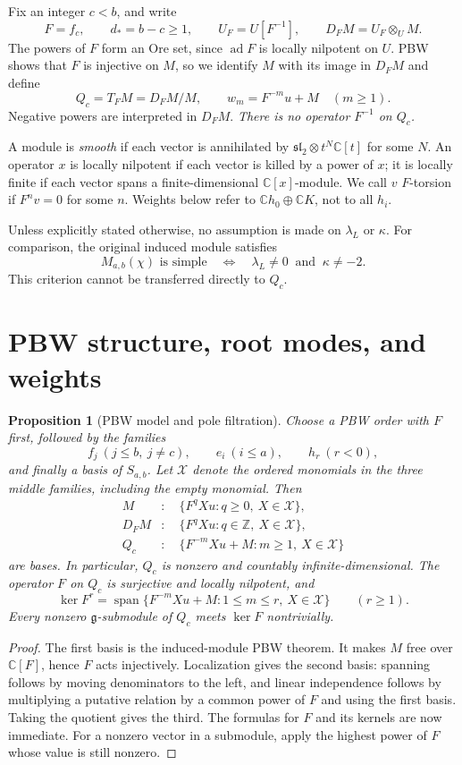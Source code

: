 \documentclass[11pt,a4paper]{article}
\newcommand{\C}{\mathbb C}
\newcommand{\Z}{\mathbb Z}
\newcommand{\g}{\mathfrak g}
\newcommand{\slc}{\mathfrak{sl}_2}
\newcommand{\ad}{\operatorname{ad}}
\newcommand{\Span}{\operatorname{span}}
\newcommand{\X}{\mathcal X}
\theoremstyle{plainupright}
\newtheorem{proposition}{Proposition}[section]
\begin{document}
Fix an integer \(c<b\), and write
\[
F=f_c,\qquad d_*=b-c\ge1,\qquad
U_F=U[F^{-1}],\qquad D_FM=U_F\otimes_U M.
\]
The powers of \(F\) form an Ore set, since \(\ad F\) is locally nilpotent on
\(U\). PBW shows that \(F\) is injective on \(M\), so we identify \(M\)
with its image in \(D_FM\) and define
\[
Q_c=T_FM=D_FM/M,\qquad w_m=F^{-m}u+M\quad(m\ge1).
\]
Negative powers are interpreted in \(D_FM\).
\emph{There is no operator \(F^{-1}\) on \(Q_c\).}

A module is \emph{smooth} if each vector is annihilated by
\(\slc\otimes t^N\C[t]\) for some \(N\).
An operator \(x\) is locally nilpotent if each vector is killed by a power of
\(x\); it is locally finite if each vector spans a finite-dimensional
\(\C[x]\)-module. We call \(v\) \(F\)-torsion if \(F^n v=0\) for some \(n\).
Weights below refer to \(\C h_0\oplus\C K\), not to all \(h_i\).

Unless explicitly stated otherwise, no assumption is made on
\(\lambda_L\) or \(\kappa\). For comparison, the original induced module
satisfies \cite[Theorem 1.1]{FGXZ}
\begin{equation}\label{eq:original-simple}
M_{a,b}(\chi)\text{ is simple}\quad\Longleftrightarrow\quad
\lambda_L\ne0\ \text{ and }\ \kappa\ne-2.
\end{equation}
This criterion cannot be transferred directly to \(Q_c\).

\section{PBW structure, root modes, and weights}

\begin{proposition}[PBW model and pole filtration]\label{prop:pbw}
Choose a PBW order with \(F\) first, followed by the families
\[
f_j\ (j\le b,\ j\ne c),\qquad e_i\ (i\le a),\qquad h_r\ (r<0),
\]
and finally a basis of \(S_{a,b}\). Let \(\X\) denote the ordered monomials
in the three middle families, including the empty monomial. Then
\begin{align*}
M &: \quad \{F^qXu:q\ge0,\ X\in\X\},\\
D_FM &: \quad \{F^qXu:q\in\Z,\ X\in\X\},\\
Q_c &: \quad \{F^{-m}Xu+M:m\ge1,\ X\in\X\}
\end{align*}
are bases. In particular, \(Q_c\) is nonzero and countably infinite-dimensional.
The operator \(F\) on \(Q_c\) is surjective and locally nilpotent, and
\[
\ker F^r=\Span\{F^{-m}Xu+M:1\le m\le r,\ X\in\X\}\qquad(r\ge1).
\]
Every nonzero \(\g\)-submodule of \(Q_c\) meets \(\ker F\) nontrivially.
\end{proposition}
\begin{proof}
The first basis is the induced-module PBW theorem. It makes \(M\) free
over \(\C[F]\), hence \(F\) acts injectively. Localization gives the second
basis: spanning follows by moving denominators to the left, and linear
independence follows by multiplying a putative relation by a common power
of \(F\) and using the first basis. Taking the quotient gives the third.
The formulas for \(F\) and its kernels are now immediate.
For a nonzero vector in a submodule, apply the highest power of \(F\)
whose value is still nonzero.
\end{proof}
\end{document}
